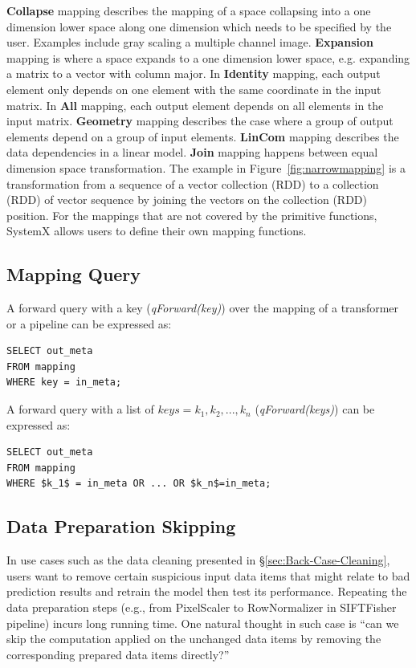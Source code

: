 \documentclass{sig-alternate}
\begin{document}
{\bf Collapse} mapping describes the mapping of a space collapsing into a one dimension lower space along one dimension which needs
to be specified by the user. Examples include gray scaling a multiple channel image.
{\bf Expansion} mapping is where a space expands to a one dimension lower space, e.g. expanding a matrix to a vector with column major.
In {\bf Identity} mapping, each output element only depends on one element with the same coordinate in the input matrix.
In {\bf All} mapping, each output element depends on all elements in the input matrix.
{\bf Geometry} mapping describes the case where a group of output elements depend on a group of input elements.
{\bf LinCom} mapping describes the data dependencies in a linear model.
{\bf Join} mapping happens between equal dimension space transformation. The example in Figure~\ref{fig:narrowmapping} 
is a transformation from a sequence of a vector collection (RDD) to a collection (RDD) of vector sequence by joining the vectors
on the collection (RDD) position.
For the mappings that are not covered by the primitive functions, SystemX allows users to define their own mapping functions.

\subsection{Mapping Query}
A forward query with a key  ({\it qForward(key)}) over the mapping of a transformer or a pipeline can be expressed as:
\begin{lstlisting}
SELECT out_meta
FROM mapping
WHERE key = in_meta;
\end{lstlisting}

A forward query with a list of $keys={k_1, k_2, ..., k_n}$ ({\it qForward(keys)}) can be expressed as:
\begin{lstlisting}
SELECT out_meta
FROM mapping
WHERE $k_1$ = in_meta OR ... OR $k_n$=in_meta;
\end{lstlisting}

\subsection{Data Preparation Skipping}
\label{sec:formal-skipping}
In use cases such as the data cleaning presented in \S\ref{sec:Back-Case-Cleaning}, users want
to remove certain suspicious input data items that might relate to bad prediction results and retrain the model then
test its performance. 
Repeating the data preparation steps (e.g., from PixelScaler to RowNormalizer in SIFTFisher pipeline) incurs
long running time.
One natural thought in such case is ``can we skip the computation applied on the unchanged data items by removing
the corresponding prepared data items directly?''
\end{document}

